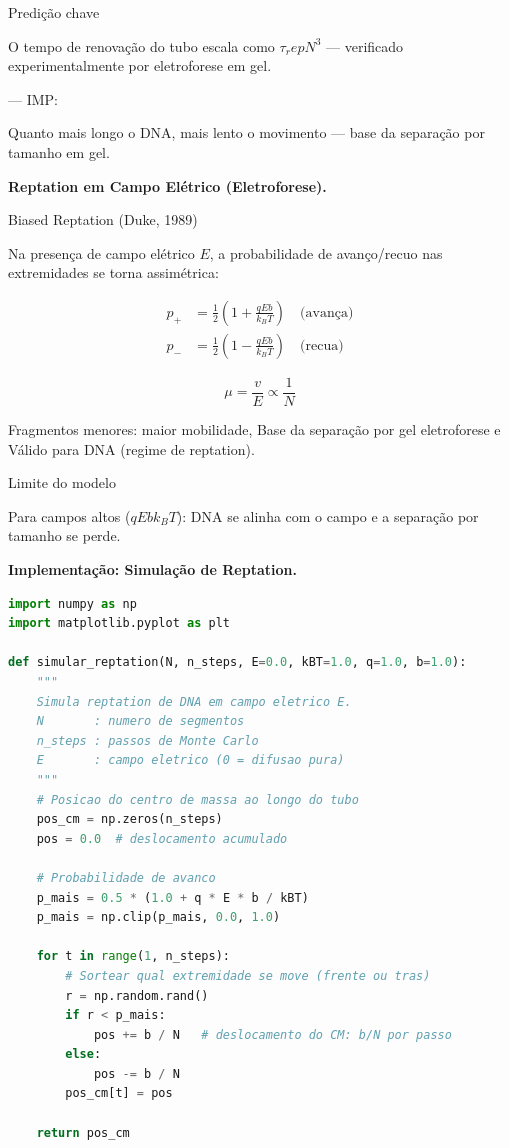 Predição chave

O tempo de renovação do tubo escala como $\tau_ rep N^3$ — verificado experimentalmente por eletroforese em gel.

--- IMP: 

Quanto mais longo o DNA, mais lento o movimento — base da separação por tamanho em gel.

\textbf{Reptation em Campo Elétrico (Eletroforese).}

Biased Reptation (Duke, 1989)

Na presença de campo elétrico $E$, a probabilidade de avanço/recuo nas extremidades se torna assimétrica:

%
\begin{align*}
p_+ &= \frac{1}{2}\left(1 + \frac{qEb}{k_BT}\right) \quad \text{(avança)}\\
p_- &= \frac{1}{2}\left(1 - \frac{qEb}{k_BT}\right) \quad \text{(recua)}
\end{align*}
%

%
\begin{equation*}
\mu = \frac{v}{E} \propto \frac{1}{N}
\end{equation*}
%

Fragmentos menores: maior mobilidade, Base da separação por gel eletroforese e Válido para DNA (regime de reptation).

Limite do modelo

Para campos altos ($qEb k_BT$): DNA se alinha com o campo e a separação por tamanho se perde.

\textbf{Implementação: Simulação de Reptation.}

%
\begin{lstlisting}[language=Python, caption=Simulação estocástica de reptation, basicstyle=\ttfamily\footnotesize]
import numpy as np
import matplotlib.pyplot as plt

def simular_reptation(N, n_steps, E=0.0, kBT=1.0, q=1.0, b=1.0):
    """
    Simula reptation de DNA em campo eletrico E.
    N       : numero de segmentos
    n_steps : passos de Monte Carlo
    E       : campo eletrico (0 = difusao pura)
    """
    # Posicao do centro de massa ao longo do tubo
    pos_cm = np.zeros(n_steps)
    pos = 0.0  # deslocamento acumulado

    # Probabilidade de avanco
    p_mais = 0.5 * (1.0 + q * E * b / kBT)
    p_mais = np.clip(p_mais, 0.0, 1.0)

    for t in range(1, n_steps):
        # Sortear qual extremidade se move (frente ou tras)
        r = np.random.rand()
        if r < p_mais:
            pos += b / N   # deslocamento do CM: b/N por passo
        else:
            pos -= b / N
        pos_cm[t] = pos

    return pos_cm
\end{lstlisting}
%

